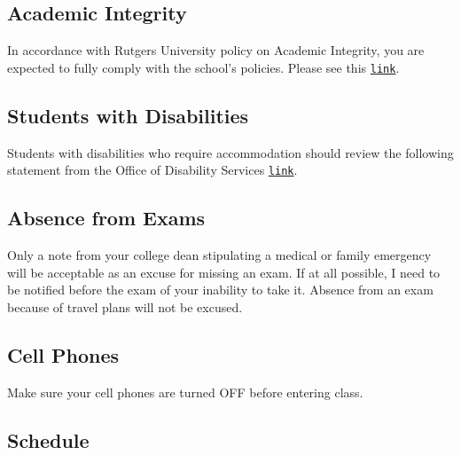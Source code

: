 \documentclass[letterpaper]{article}
\begin{document}
\subsection*{Academic Integrity}
In accordance with Rutgers University policy on Academic Integrity, you are expected to fully comply with the school's policies.  Please see this \href{http://academicintegrity.rutgers.edu}{\texttt{link}}.


\subsection*{Students with Disabilities}
Students with disabilities who require accommodation should review the following statement from the Office of Disability Services \href{https://ods.rutgers.edu/faculty/syllabus}{\texttt{link}}.


\subsection*{Absence from Exams}

Only a note from your college dean stipulating a medical or family emergency will be acceptable as an excuse for missing an exam. If at all possible, I need to be notified before the exam of your inability to take it. Absence from an exam because of travel plans will not be excused.

\subsection*{Cell Phones} 

Make sure your cell phones are turned OFF before entering class.


\subsection*{Schedule}
\end{document}
